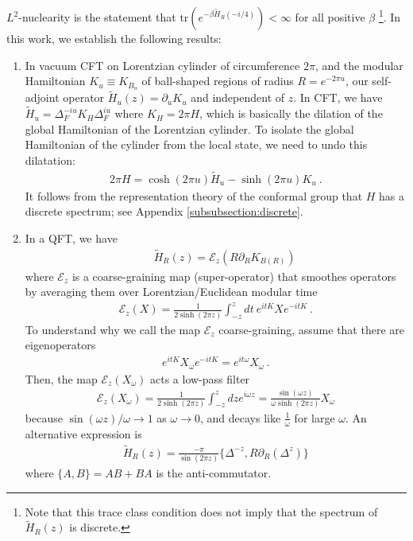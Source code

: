 \documentclass[a4paper,11pt]{article}
\theoremstyle{definition}
\newcommand{\lb}{\left(}
\newcommand{\rb}{\right)}
\newcommand{\p}{\partial}
\begin{document}
$L^2$-nuclearity is the statement that $\text{tr}(e^{-\beta\tilde{H}_R(-i/4)})<\infty$ for all positive $\beta$ \footnote{Note that this trace class condition does not imply that the spectrum of $\tilde{H}_R(z)$ is discrete.}. 
In this work, we establish the following results:
\begin{enumerate}
    \item In vacuum CFT on Lorentzian cylinder of circumference $2\pi$, and the modular Hamiltonian $K_u\equiv K_{B_u}$ of ball-shaped regions of radius $R=e^{-2\pi u}$, our self-adjoint operator 
    $\tilde{H}_u(z)=\p_u K_u$ and independent of $z$. In CFT, we have $\tilde{H}_{u}= \Delta_F^{-iu}K_H \Delta_F^{iu}$ where $K_H = 2\pi H$, which is basically the dilation of the global Hamiltonian of the Lorentzian cylinder.
    To isolate the global Hamiltonian of the cylinder from the local state, we need to undo this dilatation:
    \begin{eqnarray}
        2\pi H=\cosh(2\pi u)\tilde{H}_u-\sinh(2\pi u)K_u\ .
    \end{eqnarray}
    It follows from the representation theory of the conformal group that $H$ has a discrete spectrum; see Appendix \ref{subsubsection:discrete}.
    \item In a QFT, we have
    \begin{eqnarray}\label{Htilde}
        &&\tilde{H}_R(z)=\mathcal{E}_z\lb R\p_R K_{B(R)}\rb
    \end{eqnarray}
    where $\mathcal{E}_z$ is a coarse-graining map (super-operator) that smoothes operators by averaging them over Lorentzian/Euclidean modular time
    \begin{eqnarray}\label{Ez}
        \mathcal{E}_z(X)=\frac{1}{2\sinh(2\pi z)}\int_{-z}^zdt\: e^{i t K}X e^{-i t K}\ .
    \end{eqnarray}
To understand why we call the map $\mathcal{E}_z$ coarse-graining, assume that there are eigenoperators 
\begin{eqnarray}\label{eigenop}
    e^{it K}X_\omega e^{-i t K}=e^{it \omega}X_\omega\ .
\end{eqnarray}
Then, the map $\mathcal{E}_z(X_\omega)$ acts a low-pass filter
\begin{eqnarray}\label{filter}
    \mathcal{E}_z(X_\omega)=\frac{1}{2\sinh(2\pi z)}\int_{-z}^z dz e^{i\omega z}=\frac{\sin(\omega z)}{\omega \sinh(2\pi z)}X_\omega
\end{eqnarray}
because $\sin(\omega z)/\omega\to 1$ as $\omega\to 0$, and decays like $\frac{1}{\omega}$ for large $\omega$. An alternative expression is
\begin{eqnarray}
    \tilde{H}_R(z)={\frac{-\pi}{\sin(2\pi z)}}\{\Delta^{-z},R\p_R(\Delta^z)\}
\end{eqnarray}
where $\{A,B\}=AB+BA$ is the anti-commutator.



\end{enumerate}
\end{document}
